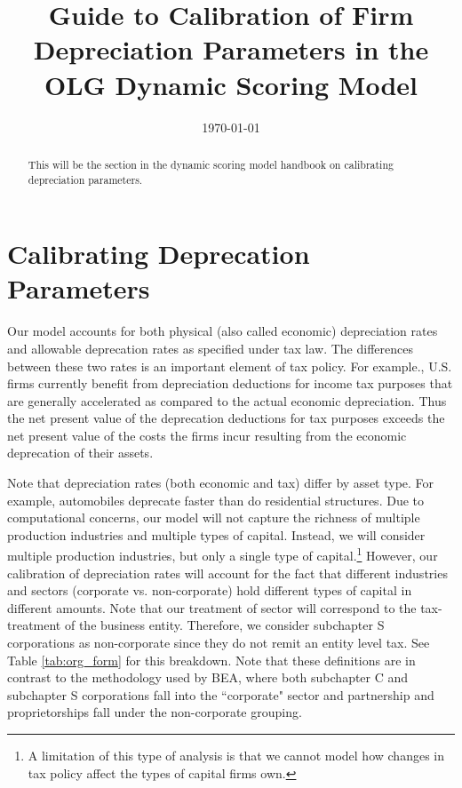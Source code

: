 \documentclass[article,11pt,letterpaper,fleqn]{article}
\title{Guide to Calibration of Firm Depreciation Parameters in the OLG Dynamic Scoring Model}
\date{\today}
\theoremstyle{definition}
\numberwithin{equation}{section}
\begin{document}

\maketitle



\begin{abstract}
This will be the section in the dynamic scoring model handbook on calibrating depreciation parameters.
\end{abstract}

\section{Calibrating Deprecation Parameters}

Our model accounts for both physical (also called economic) depreciation rates and allowable deprecation rates as specified under tax law.  The differences between these two rates is an important element of tax policy.  For example., U.S. firms currently benefit from depreciation deductions for income tax purposes that are generally accelerated as compared to the actual economic depreciation.  Thus the net present value of the deprecation deductions for tax purposes exceeds the net present value of the costs the firms incur resulting from the economic deprecation of their assets.  

Note that depreciation rates (both economic and tax) differ by asset type.  For example, automobiles deprecate faster than do residential structures.  Due to computational concerns, our model will not capture the richness of multiple production industries and multiple types of capital.  Instead, we will consider multiple production industries, but only a single type of capital.\footnote{A limitation of this type of analysis is that we cannot model how changes in tax policy affect the types of capital firms own.}  However, our calibration of depreciation rates will account for the fact that different industries and sectors (corporate vs. non-corporate) hold different types of capital in different amounts.  Note that our treatment of sector will correspond to the tax-treatment of the business entity.  Therefore, we consider subchapter S corporations as non-corporate since they do not remit an entity level tax.  See Table \ref{tab:org_form} for this breakdown.  Note that these definitions are in contrast to the methodology used by BEA, where both subchapter C and subchapter S corporations fall into the ``corporate" sector and partnership and proprietorships fall under the non-corporate grouping.  
\end{document}
